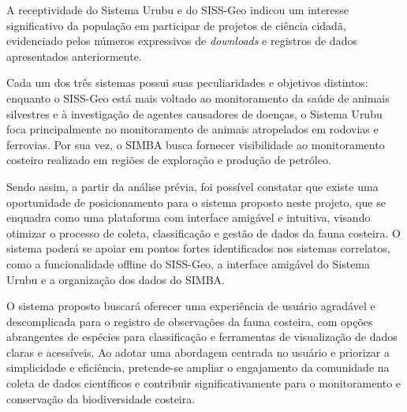 A receptividade do Sistema Urubu e do SISS-Geo indicou um interesse significativo da população em participar de projetos de ciência cidadã, evidenciado pelos números expressivos de \textit{downloads} e registros de dados apresentados anteriormente.

Cada um dos três sistemas possui suas peculiaridades e objetivos distintos: enquanto o SISS-Geo está mais voltado ao monitoramento da saúde de animais silvestres e à investigação de agentes causadores de doenças, o Sistema Urubu foca principalmente no monitoramento de animais atropelados em rodovias e ferrovias. Por sua vez, o SIMBA busca fornecer visibilidade ao monitoramento costeiro realizado em regiões de exploração e produção de petróleo.

Sendo assim, a partir da análise prévia, foi possível constatar que existe uma oportunidade de posicionamento para o sistema proposto neste projeto, que se enquadra como uma plataforma com interface amigável e intuitiva, visando otimizar o processo de coleta, classificação e gestão de dados da fauna costeira. O sistema poderá se apoiar em pontos fortes identificados nos sistemas correlatos, como a funcionalidade offline do SISS-Geo, a interface amigável do Sistema Urubu e a organização dos dados do SIMBA.

O sistema proposto buscará oferecer uma experiência de usuário agradável e descomplicada para o registro de observações da fauna costeira, com opções abrangentes de espécies para classificação e ferramentas de visualização de dados claras e acessíveis. Ao adotar uma abordagem centrada no usuário e priorizar a simplicidade e eficiência, pretende-se ampliar o engajamento da comunidade na coleta de dados científicos e contribuir significativamente para o monitoramento e conservação da biodiversidade costeira.
